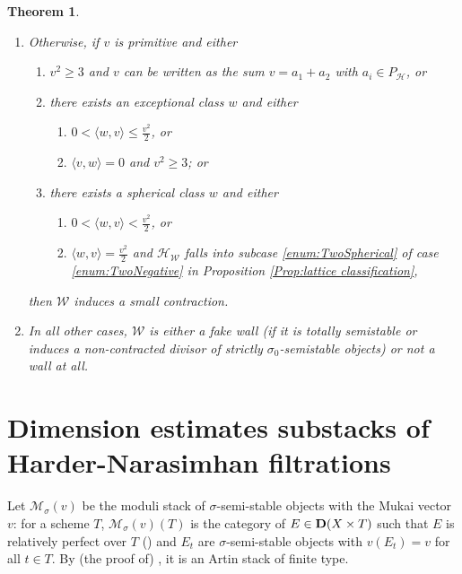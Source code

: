 \documentclass[leqno,11pt]{amsart}
\newtheorem{Thm}{Theorem}[section]
\theoremstyle{definition}
\def\HH{\ensuremath{\mathcal H}}
\def\MM{\ensuremath{\mathcal M}}
\def\WW{\ensuremath{\mathcal W}}
\begin{document}
\begin{Thm}
\begin{enumerate}
\begin{description*}
\end{description*}
\item\label{thm:Classification,Flops}
Otherwise, if $v$ is primitive and either
\begin{enumerate}
\item \label{enum:sum2positive}
$v^2\geq 3$ and $v$ can be written as the sum 
$v = a_1 + a_2$ with $a_i\in P_\HH$, or 
\item\label{enum:exceptional} there exists an exceptional class $w$ and either
\begin{enumerate}
\item\label{enum:exceptionalflop1}
$0< \langle  w,v\rangle\leq\frac{v^2}{2}$, or
\item\label{enum:exceptionalflop2}
$\langle v,w\rangle=0$ and $v^2\geq 3$; or
\end{enumerate}
\item\label{enum:spherical} there exists a spherical class $w$ and either
\begin{enumerate}
\item\label{enum:sphericalflop1}
$0 < \langle w, v\rangle < \frac{v^2}2$, or
\item\label{enum:sphericalflop2}
$\langle w,v\rangle=\frac{v^2}{2}$ and $\HH_{\WW}$ falls into subcase \ref{enum:TwoSpherical} of case \ref{enum:TwoNegative} in Proposition \ref{Prop:lattice classification},
\end{enumerate}
\end{enumerate}
then $\WW$ induces a small contraction.
\item In all other cases, $\WW$ is either a fake wall (if it is totally semistable or induces a non-contracted divisor of strictly $\sigma_0$-semistable objects) or not a wall at all.
\end{enumerate}


\end{Thm}

\section{Dimension estimates substacks of Harder-Narasimhan filtrations}
 
Let $\MM_{\sigma}(v)$ be the moduli stack of 
$\sigma$-semi-stable objects with the Mukai vector $v$:
for a scheme $T$,
$\MM_{\sigma}(v)(T)$ is the category of $E \in {\bf D}(X \times T)$ such that $E$ is relatively perfect over $T$ (\cite[Defn. 2.1.1]{L}) and 
$E_t$ are $\sigma$-semi-stable objects
with $v(E_t)=v$ for all $t \in T$. 
By (the proof of) \cite[Thm. 4.12]{Tod08}, 
it is an Artin stack of finite type.
\end{document}
